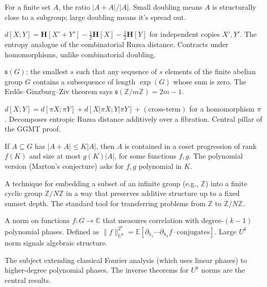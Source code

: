 \documentclass[11pt,a4paper]{article}
\theoremstyle{plain}
\theoremstyle{definition}
\theoremstyle{remark}
\newcommand{\Z}{\mathbb{Z}}
\newcommand{\C}{\mathbb{C}}
\newcommand{\E}{\mathbb{E}}
\newcommand{\entropy}{\mathbf{H}}
\newcommand{\sUFp}{\mathfrak{s}}
\newcommand{\dist}{d}
\begin{document}
\begin{description}[leftmargin=0pt]
\item[\textbf{Doubling constant}] For a finite set $A$, the ratio $|A + A| / |A|$. Small doubling means $A$ is structurally close to a subgroup; large doubling means it's spread out.

\item[\textbf{Entropic Ruzsa distance}] $\dist[X; Y] = \entropy[X' + Y'] - \frac{1}{2}\entropy[X] - \frac{1}{2}\entropy[Y]$ for independent copies $X', Y'$. The entropy analogue of the combinatorial Ruzsa distance. Contracts under homomorphisms, unlike combinatorial doubling.

\item[\textbf{EGZ constant}] $\sUFp(G)$: the smallest $s$ such that any sequence of $s$ elements of the finite abelian group $G$ contains a subsequence of length $\exp(G)$ whose sum is zero. The Erd\H{o}s--Ginzburg--Ziv theorem says $\sUFp(\Z/m\Z) = 2m - 1$.

\item[\textbf{Fibring identity}] $\dist[X; Y] = \dist[\pi X; \pi Y] + \dist[X|\pi X; Y|\pi Y] + (\text{cross-term})$ for a homomorphism $\pi$. Decomposes entropic Ruzsa distance additively over a fibration. Central pillar of the GGMT proof.

\item[\textbf{Freiman--Ruzsa theorem}] If $A \subseteq G$ has $|A + A| \leq K|A|$, then $A$ is contained in a coset progression of rank $f(K)$ and size at most $g(K) |A|$, for some functions $f, g$. The polynomial version (Marton's conjecture) asks for $f, g$ polynomial in $K$.

\item[\textbf{Freiman modeling}] A technique for embedding a subset of an infinite group (e.g., $\Z$) into a finite cyclic group $\Z/N\Z$ in a way that preserves additive structure up to a fixed sumset depth. The standard tool for transferring problems from $\Z$ to $\Z/N\Z$.

\item[\textbf{Gowers norm $U^k$}] A norm on functions $f: G \to \C$ that measures correlation with degree-$(k-1)$ polynomial phases. Defined as $\|f\|_{U^k}^{2^k} = \E [\partial_{h_1} \cdots \partial_{h_k} f \cdot \text{conjugates}]$. Large $U^k$ norm signals algebraic structure.

\item[\textbf{Higher-order Fourier analysis}] The subject extending classical Fourier analysis (which uses linear phases) to higher-degree polynomial phases. The inverse theorems for $U^k$ norms are the central results.


\end{description}
\end{document}
